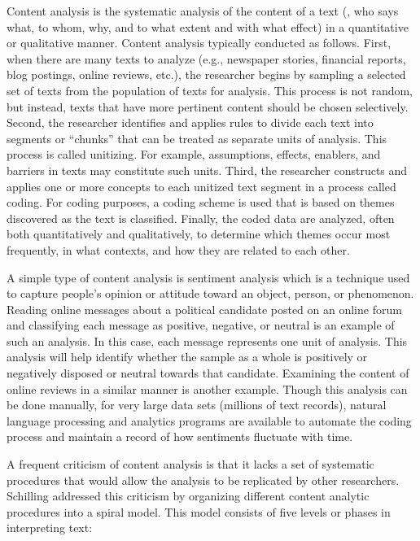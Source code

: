Content analysis is the systematic analysis of the content of a text (\eg, who says what, to whom, why, and to what extent and with what effect) in a quantitative or qualitative manner. Content analysis typically conducted as follows. First, when there are many texts to analyze (e.g., newspaper stories, financial reports, blog postings, online reviews, etc.), the researcher begins by sampling a selected set of texts from the population of texts for analysis. This process is not random, but instead, texts that have more pertinent content should be chosen selectively. Second, the researcher identifies and applies rules to divide each text into segments or ``chunks'' that can be treated as separate units of analysis. This process is called unitizing. For example, assumptions, effects, enablers, and barriers in texts may constitute such units. Third, the researcher constructs and applies one or more concepts to each unitized text segment in a process called coding. For coding purposes, a coding scheme is used that is based on themes discovered as the text is classified. Finally, the coded data are analyzed, often both quantitatively and qualitatively, to determine which themes occur most frequently, in what contexts, and how they are related to each other.

A simple type of content analysis is sentiment analysis which is a technique used to capture people's opinion or attitude toward an object, person, or phenomenon. Reading online messages about a political candidate posted on an online forum and classifying each message as positive, negative, or neutral is an example of such an analysis. In this case, each message represents one unit of analysis. This analysis will help identify whether the sample as a whole is positively or negatively disposed or neutral towards that candidate. Examining the content of online reviews in a similar manner is another example. Though this analysis can be done manually, for very large data sets (millions of text records), natural language processing and analytics programs are available to automate the coding process and maintain a record of how sentiments fluctuate with time.

A frequent criticism of content analysis is that it lacks a set of systematic procedures that would allow the analysis to be replicated by other researchers. Schilling\cite{schilling2006pragmatics} addressed this criticism by organizing different content analytic procedures into a spiral model. This model consists of five levels or phases in interpreting text: 

